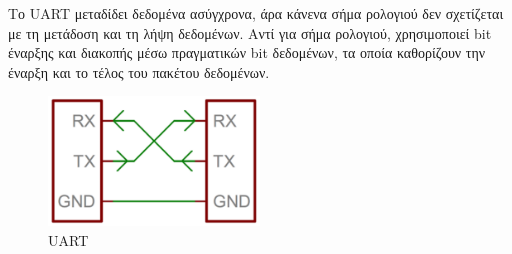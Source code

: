 Το UART μεταδίδει δεδομένα ασύγχρονα, άρα κάνενα σήμα ρολογιού δεν σχετίζεται με τη μετάδοση και τη λήψη δεδομένων. Αντί για σήμα ρολογιού, χρησιμοποιεί bit έναρξης και διακοπής μέσω πραγματικών bit δεδομένων, τα οποία καθορίζουν την έναρξη και το τέλος του πακέτου δεδομένων.

\begin{figure}[!ht]
	\centering
	\includegraphics[width=0.5\textwidth]{./images/chapter2/uart.png}
	\caption{UART}
	\label{fig:uart}
\end{figure}